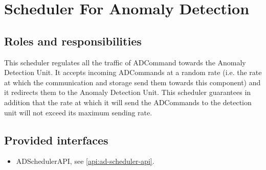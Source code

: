 \section{Scheduler For Anomaly Detection}
\label{element:ad-scheduler}

\subsection{Roles and responsibilities}

\npar This scheduler regulates all the traffic of ADCommand towards the
Anomaly Detection Unit. It accepts incoming ADCommands at a random rate (i.e.
the rate at which the communication and storage send them towards this
component) and it redirects them to the Anomaly Detection Unit. This
scheduler guarantees in addition that the rate at which it will send the
ADCommands to the detection unit will not exceed its maximum sending rate.

\subsection{Provided interfaces}

\begin{itemize}
  \item ADSchedulerAPI, see \ref{api:ad-scheduler-api}.
\end{itemize}



